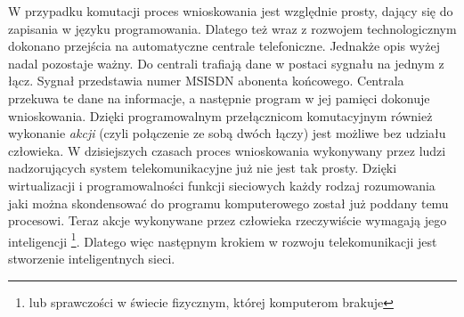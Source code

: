W przypadku komutacji proces wnioskowania jest względnie prosty, dający się do zapisania w języku programowania. Dlatego też wraz z rozwojem technologicznym dokonano przejścia na automatyczne centrale telefoniczne. Jednakże opis wyżej nadal pozostaje ważny. Do centrali trafiają dane w postaci sygnału na jednym z łącz. Sygnał przedstawia numer MSISDN abonenta końcowego. Centrala przekuwa te dane na informacje, a następnie program w jej pamięci dokonuje wnioskowania. Dzięki programowalnym przełącznicom komutacyjnym również wykonanie \textit{akcji} (czyli połączenie ze sobą dwóch łączy) jest możliwe bez udziału człowieka. W dzisiejszych czasach proces wnioskowania wykonywany przez ludzi nadzorujących system telekomunikacyjne już nie jest tak prosty. Dzięki wirtualizacji i programowalności funkcji sieciowych każdy rodzaj rozumowania jaki można skondensować do programu komputerowego został już poddany temu procesowi. Teraz akcje wykonywane przez człowieka rzeczywiście wymagają jego inteligencji \footnote{lub sprawczości w świecie fizycznym, której komputerom brakuje}. Dlatego więc następnym krokiem w rozwoju telekomunikacji jest stworzenie inteligentnych sieci. 